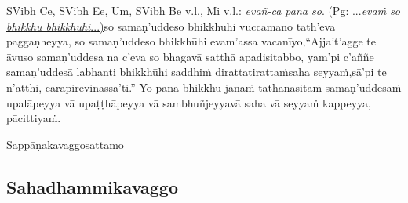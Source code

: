 {{{		\hypertarget{endnote373-appendix}{\hyperlink{endnote373-body}{SVibh Ce, SVibh Ee, Um, SVibh Be v.l., Mi v.l.: \textit{evañ-ca pana so}. (Pg: ...\textit{evaṁ so bhikkhu bhikkhūhi}...)}}}}}\makeatother \thinspace so samaṇ'uddeso bhikkhūhi vuccamāno tath'eva paggaṇheyya, so samaṇ'uddeso bhikkhūhi evam'assa vacanīyo,\makeatletter\hyperlink{endnote374-appendix}\makeatother \thinspace ``Ajja't'agge te āvuso samaṇ'uddesa na c'eva so bhagavā satthā apadisitabbo, yam'pi c'aññe samaṇ'uddesā labhanti bhikkhūhi saddhiṁ dirattatirattaṁ\makeatletter\hyperlink{endnote375-appendix}\makeatother \thinspace saha seyyaṁ,\makeatletter\hyperlink{endnote376-appendix}\makeatother \thinspace sā'pi te n'atthi, carapire\makeatletter\hyperlink{endnote377-appendix}\makeatother \thinspace vinassā'ti.'' Yo pana bhikkhu jānaṁ tathānāsitaṁ samaṇ'uddesaṁ upalāpeyya vā upaṭṭhāpeyya vā sambhuñjeyya\makeatletter\hyperlink{endnote378-appendix}\makeatother \thinspace vā saha vā seyyaṁ kappeyya, pācittiyaṁ.

\begin{center}
	Sappāṇakavaggo\makeatletter\hyperlink{endnote379-appendix}\makeatother \thinspace sattamo
\end{center}



\subsection{Sahadhammikavaggo}

